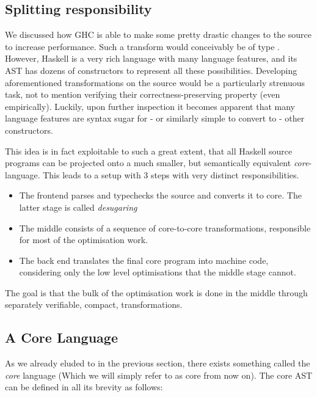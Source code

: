 \subsection{Splitting responsibility}

We discussed how GHC is able to make some pretty drastic changes to the source to increase performance.
Such a transform would conceivably be of type  .
However, Haskell is a very rich language with many language features, and its AST 
has dozens of constructors to represent all these possibilities.
Developing aforementioned transformations on the source would be a particularly strenuous task, not to mention verifying their correctness-preserving property (even empirically).
Luckily, upon further inspection it becomes apparent that many language features are syntax 
sugar for - or similarly simple to convert to - other constructors.

This idea is in fact exploitable to such a great extent, that all Haskell source
programs can be projected onto a much smaller, but semantically equivalent \textit{core}-language.
This leads to a setup with 3 steps with very distinct responsibilities.

\begin{itemize}
  \item The frontend parses and typechecks the source and converts it to core. The latter stage is called \textit{desugaring}
  \item The middle consists of a sequence of core-to-core transformations, responsible for most of the optimisation work.
  \item The back end translates the final core program into machine code, considering only the low level optimisations that the middle stage cannot.
\end{itemize}

The goal is that the bulk of the optimisation work is done in the middle through separately verifiable, compact, transformations. \cite{haskell_optimisations_1997}

\subsection{A Core Language}

As we already eluded to in the previous section, there exists something called the \textit{core} language (Which we will simply refer to as core from now on).
The core AST can be defined in all its brevity as follows:

